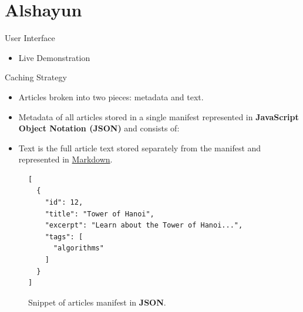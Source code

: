 \documentclass{beamer}
\begin{document}
\section{Alshayun}

\begin{frame}{User Interface}
    \begin{itemize}
        \item Live Demonstration
    \end{itemize}
\end{frame}

\begin{frame}{Caching Strategy}
    \begin{itemize}
        \item Articles broken into two pieces: metadata and text.
        \item Metadata of all articles stored in a single manifest represented
            in \textbf{JavaScript Object Notation (JSON)} and consists of:
        \item Text is the full article text stored separately from the manifest
            and represented in
            \href{https://daringfireball.net/projects/markdown/}{Markdown}.
    \end{itemize}
    \begin{figure}
    \begin{verbatim}
[
  {
    "id": 12,
    "title": "Tower of Hanoi",
    "excerpt": "Learn about the Tower of Hanoi...",
    "tags": [
      "algorithms"
    ]
  }
]
    \end{verbatim}
    \caption{Snippet of articles manifest in \textbf{JSON}.}
    \end{figure}
\end{frame}
\end{document}
